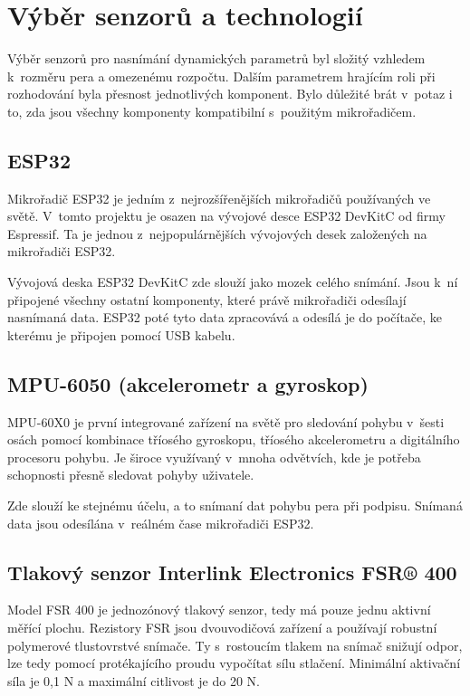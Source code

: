 \section{Výběr senzorů a technologií}
Výběr senzorů pro nasnímání dynamických parametrů byl složitý vzhledem k~rozměru pera a omezenému rozpočtu. %
Dalším parametrem hrajícím roli při rozhodování byla přesnost jednotlivých komponent.                       %
Bylo důležité brát v~potaz i to, zda jsou všechny komponenty kompatibilní s~použitým mikrořadičem.          %

\subsection*{ESP32}
Mikrořadič ESP32 je jedním z~nejrozšířenějších mikrořadičů používaných ve světě.                            %
V~tomto projektu je osazen na vývojové desce ESP32 DevKitC od firmy Espressif.                              %
Ta je jednou z~nejpopulárnějších vývojových desek založených na mikrořadiči ESP32.~\cite{Kolban2017}        %

Vývojová deska ESP32 DevKitC zde slouží jako mozek celého snímání.                                          %
Jsou k~ní připojené všechny ostatní komponenty, které právě mikrořadiči odesílají nasnímaná data.           %
ESP32 poté tyto data zpracovává a odesílá je do počítače, ke kterému je připojen  pomocí USB kabelu.        %

\subsection*{MPU-6050 (akcelerometr a gyroskop)}
MPU-60X0 je první integrované zařízení na světě pro sledování pohybu v~šesti osách pomocí           %
kombinace tříosého gyroskopu, tříosého akcelerometru a digitálního procesoru pohybu.                %
Je široce využívaný v~mnoha odvětvích, kde je potřeba schopnosti přesně sledovat pohyby uživatele.~\cite{InvenSense2015}%

Zde slouží ke stejnému účelu, a to snímaní dat pohybu pera při podpisu.                             %
Snímaná data jsou odesílána v~reálném čase mikrořadiči ESP32.                                       %

\subsection*{Tlakový senzor Interlink Electronics FSR® 400}
Model FSR 400 je jednozónový tlakový senzor, tedy má pouze jednu aktivní měřící plochu.                       %
Rezistory FSR jsou dvouvodičová zařízení a používají robustní polymerové tlustovrstvé snímače.                %
Ty s~rostoucím tlakem na snímač snižují odpor, lze tedy pomocí protékajícího proudu vypočítat sílu stlačení.  %
Minimální aktivační síla je 0,1 N a maximální citlivost je do 20 N.~\cite{InterlinkElectronicsFSR400}         %

